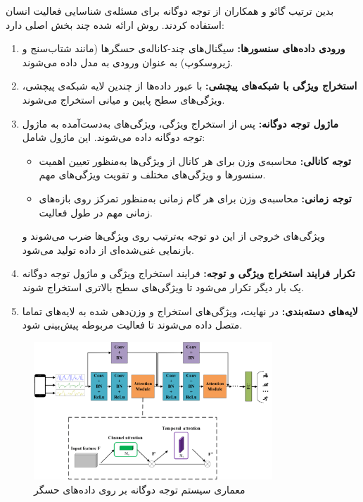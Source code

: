 بدین ترتیب گائو و همکاران از توجه دوگانه برای مسئله‌ی شناسایی فعالیت انسان استفاده کردند. روش ارائه شده چند بخش اصلی دارد:
\begin{enumerate}
    \item \textbf{ورودی داده‌های سنسورها:}
    سیگنال‌های چند-کاناله‌ی حسگرها (مانند شتاب‌سنج و ژیروسکوپ) به عنوان ورودی به مدل داده می‌شوند.

    \item \textbf{استخراج ویژگی با شبکه‌های پیچشی:}
    با عبور داده‌ها از چندین لایه شبکه‌ی پیچشی، ویژگی‌های سطح پایین و میانی استخراج می‌شوند.

    \item \textbf{ماژول توجه دوگانه:}
    پس از استخراج ویژگی، ویژگی‌های به‌دست‌آمده به ماژول توجه دوگانه داده می‌شوند. این ماژول شامل:
    \begin{itemize}
        \item \textbf{توجه کانالی:} محاسبه‌ی وزن برای هر کانال از ویژگی‌ها به‌منظور تعیین اهمیت سنسورها و ویژگی‌های مختلف و تقویت ویژگی‌های مهم.
        \item \textbf{توجه زمانی:} محاسبه‌ی وزن برای هر گام زمانی به‌منظور تمرکز روی بازه‌های زمانی مهم در طول فعالیت.
    \end{itemize}
    ویژگی‌های خروجی از این دو توجه به‌ترتیب روی ویژگی‌ها ضرب می‌شوند و بازنمایی غنی‌شده‌ای از داده تولید می‌شود.

    \item \textbf{تکرار فرایند استخراج ویژگی و توجه:}
    فرایند استخراج ویژگی و ماژول توجه دوگانه یک بار دیگر تکرار می‌شود تا ویژگی‌های سطح بالاتری استخراج شوند.

    \item \textbf{لایه‌های دسته‌بندی:}
    در نهایت، ویژگی‌های استخراج و وزن‌دهی شده به لایه‌های تماما متصل داده می‌شوند تا فعالیت مربوطه پیش‌بینی شود.
\end{enumerate}
\begin{figure}[htbp]
  \centering
  \includegraphics[width=0.8\textwidth]{Images/Chapter2/danhar.png}
  \caption{معماری سیستم توجه دوگانه بر روی داده‌های حسگر}
  \label{fig:danhar}
\end{figure}

